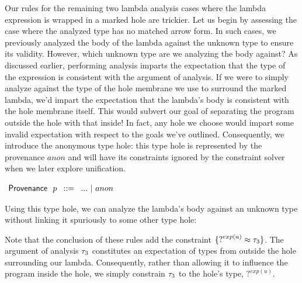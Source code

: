 Our rules for the remaining two lambda analysis cases where the lambda expression is wrapped in a marked hole are trickier. Let us begin by assessing the case where the analyzed type has no matched arrow form. In such cases, we previously analyzed the body of the lambda against the unknown type to ensure its validity. However, which unknown type are we analyzing the body against? As discussed earlier, performing analysis imparts the expectation that the type of the expression is consistent with the argument of analysis. If we were to simply analyze against the type of the hole membrane we use to surround the marked lambda, we'd impart the expectation that the lambda's body is consistent with the hole membrane itself. This would subvert our goal of separating the program outside the hole with that inside! In fact, any hole we choose would impart some invalid expectation with respect to the goals we've outlined. Consequently, we introduce the anonymous type hole: this type hole is represented by the provenance $anon$ and will have its constraints ignored by the constraint solver when we later explore unification.
\begin{center}
    $\arraycolsep=4pt\begin{array}{lll}
    \Prov~~ p & ::= & 
        ... ~\vert~ 
        anon
        \\
    \end{array}$
\end{center}
Using this type hole, we can analyze the lambda's body against an unknown type without linking it spuriously to some other type hole:
\begin{mathpar}

\end{mathpar}
Note that the conclusion of these rules add the constraint $\{ \TUnknown^{exp(u)} \approx \TMV_3 \}$. The argument of analysis $\TMV_3$ constitutes an expectation of types from outside the hole surrounding our lambda. Consequently, rather than allowing it to influence the program inside the hole, we simply constrain $\TMV_3$ to the hole's type, $?^{exp(u)}$.

